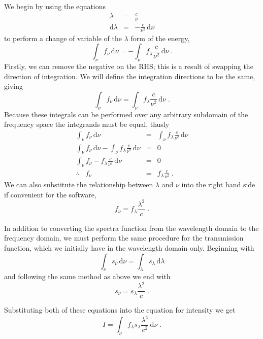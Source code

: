 \documentclass[12pt]{scrartcl}
\newcommand{\dx}[1]{\ensuremath{\,\mathrm{d}#1}}
\begin{document}
We begin by using the equations
\begin{eqnarray*}
\lambda & = & \frac{c}{\nu} \\
\mathrm{d}{\lambda} & = & -\frac{c}{\nu^2}\dx{\nu}
\end{eqnarray*}
to perform a change of variable of the $\lambda$ form of the energy,
\[ \int_\nu f_\nu \dx{\nu} = -\int_\nu f_\lambda \frac{c}{\nu^2} \dx{\nu} \; . \]
Firstly, we can remove the negative on the RHS; this is a result
of swapping the direction of integration. We will define the integration
directions to be the same, giving
\[ \int_\nu f_\nu \dx{\nu} = \int_\nu f_\lambda \frac{c}{\nu^2} \dx{\nu} \; . \]
Because these integrals can be performed over any arbitrary subdomain of the
frequency space the integrands must be equal, thusly
\begin{eqnarray*}
\int_\nu f_\nu \dx{\nu} & = & \int_\nu f_\lambda \frac{c}{\nu^2} \dx{\nu} \\
\int_\nu f_\nu \dx{\nu} - \int_\nu f_\lambda \frac{c}{\nu^2} \dx{\nu} & = & 0 \\
\int_\nu f_\nu - f_\lambda \frac{c}{\nu^2} \dx{\nu} & = & 0 \\
\therefore \;\;\; f_\nu & = & f_\lambda \frac{c}{\nu^2} \; .
\end{eqnarray*}
We can also substitute the relationship between $\lambda$ and $\nu$ into
the right hand side if convenient for the software,
\[ f_\nu = f_\lambda \frac{\lambda^2}{c} \; . \]

In addition to converting the spectra function from the wavelength domain
to the frequency domain, we must perform the same procedure for the
transmission function, which we initially have in the wavelength domain
only. Beginning with
\[ \int_\nu s_\nu \dx{\nu} = \int_\lambda s_\lambda \dx{\lambda} \]
and following the same method as above we end with
\[ s_\nu = s_\lambda \frac{\lambda^2}{c} \; . \]

Substituting both of these equations into the equation for intensity
we get
\[ I = \int_\nu f_\lambda s_\lambda\frac{\lambda^4}{c^2}\dx{\nu} \; . \]
\end{document}
